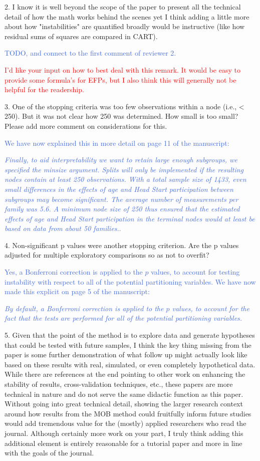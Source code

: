 \documentclass{letter}
\newcommand{\auth}[1]{\textcolor{RoyalBlue}{#1}}
\newcommand{\MF}[1]{\textcolor{red}{#1}}
\begin{document}
2.      I know it is well beyond the scope of the paper to present all the technical detail of how the math works behind the scenes yet I think adding a little more about how "instabilities" are quantified broadly would be instructive (like how residual sums of squares are compared in CART).

\auth{TODO, and connect to the first comment of reviewer 2.}

\MF{I'd like your input on how to best deal with this remark. It would be easy to provide some formula's for EFPs, but I also think this will generally not be helpful for the readership.}

3.      One of the stopping criteria was too few observations within a node (i.e., < 250). But it was not clear how 250 was determined. How small is too small? Please add more comment on considerations for this.

\auth{We have now explained this in more detail on page 11 of the manuscript:}

\auth{\textit{Finally, to aid interpretability we want to retain large enough subgroups, we specified the minsize argument. Splits will only be implemented if the resulting nodes contain at least 250 observations. With a total sample size of 1433, even small differences in the effects of age and Head Start participation between subgroups may become significant. The average number of measurements per family was 5.6.
A minimum node size of 250 thus ensured that the estimated effects of age and Head Start
participation in the terminal nodes would at least be based on data from about 50 families.}.}

4.      Non-significant p values were another stopping criterion. Are the p values adjusted for multiple exploratory comparisons so as not to overfit?

\auth{Yes, a Bonferroni correction is applied to the $p$ values, to account for testing instability with respect to all of the potential partitioning variables. We have now made this explicit on page 5 of the manuscript:}

\auth{\textit{By default, a Bonferroni correction is applied to the $p$ values, to account for the fact that the tests are performed for all of the potential partitioning variables.}}

5.      Given that the point of the method is to explore data and generate hypotheses that could be tested with future samples, I think the key thing missing from the paper is some further demonstration of what follow up might actually look like based on these results with real, simulated, or even completely hypothetical data. While there are references at the end pointing to other work on enhancing the stability of results, cross-validation techniques, etc., these papers are more technical in nature and do not serve the same didactic function as this paper. Without going into great technical detail, showing the larger research context around how results from the MOB method could fruitfully inform future studies would add tremendous value for the (mostly) applied researchers who read the journal. Although certainly more work on your part, I truly think adding this additional element is entirely reasonable for a tutorial paper and more in line with the goals of the journal.
\end{document}

